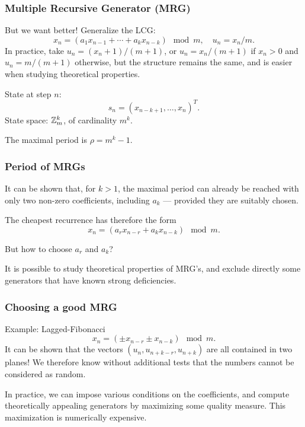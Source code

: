 \documentclass[aspectratio=169]{beamer}
\def\blue{\color{blue}}
\begin{document}
	\begin{frame}
		\frametitle{Multiple Recursive Generator (MRG)}
		
		But we want better! Generalize the LCG:
		\[
		x_n = (a_1 x_{n-1} + \cdots + a_k x_{n-k}) \mod {m}, \quad  
		u_n = x_n / m.
		\]
		In practice, take $u_n = (x_n + 1) / (m+1)$, or $u_n =
		x_n/(m+1)$ if $x_n>0$ and $u_n = m/(m+1)$ otherwise, but the structure
		remains the same, and is easier when studying theoretical properties.
		
		\mbox{}
		
		State at step $n$:
		\[
		s_n = (x_{n-k+1},\dots,x_n)^T.
		\]
		State space: ${\mathbb{Z}}_m^k$, of cardinality $m^k$.
		
		\mbox{}
		
		The maximal period is $\rho = m^k-1$.
		
	\end{frame}
	
	\begin{frame}
		\frametitle{Period of MRGs}
		
		It can be shown that, for $k > 1$, the maximal period can already be
		reached with only {\blue two} non-zero coefficients, including $a_k$ ---
		provided they are suitably chosen.
		
		\mbox{}
		
		The cheapest recurrence has therefore the form
		\[
		x_n = (a_r x_{n-r} + a_k x_{n-k}) \mod m.
		\]
		
		\mbox{}
		
		But how to choose $a_r$ and $a_k$?
		
		\mbox{}
		
		It is possible to study theoretical properties of MRG's, and exclude
		directly some generators that have known strong deficiencies.
		
	\end{frame}
	
	\begin{frame}
		\frametitle{Choosing a good MRG}
		
		{\blue Example: Lagged-Fibonacci}
		\[
		x_n = (\pm x_{n-r} \pm x_{n-k}) \mod m.
		\]
		It can be shown that the vectors $(u_n, u_{n+k-r}, u_{n+k})$ are all
		contained in two planes! We therefore know without additional tests
		that the numbers cannot be considered as random.
		
		\mbox{}
		
		In practice, we can impose various conditions on the coefficients, and
		compute theoretically appealing generators by maximizing some quality
		measure. This maximization is numerically expensive.
		
	\end{frame}
	
\end{document}
